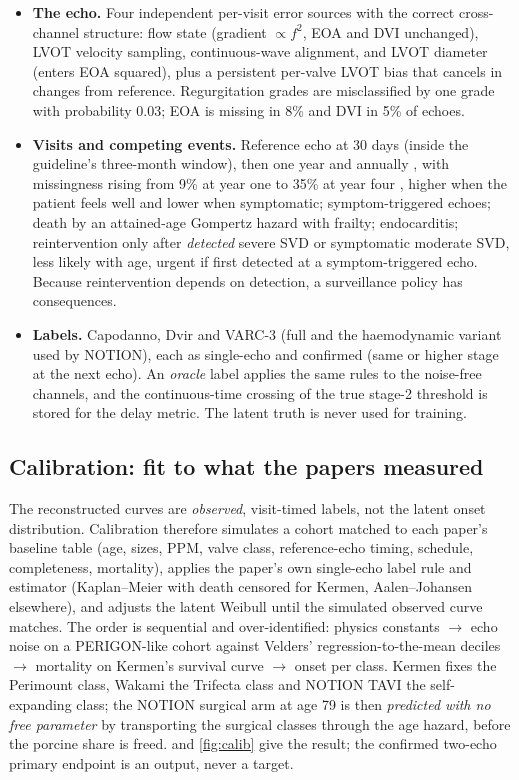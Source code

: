 \documentclass[11pt,a4paper]{article}
\begin{document}
\begin{itemize}
\item \textbf{The echo.} Four independent per-visit error sources with the correct cross-channel structure: flow state (gradient $\propto f^2$, EOA and DVI unchanged), LVOT velocity sampling, continuous-wave alignment, and LVOT diameter (enters EOA squared), plus a persistent per-valve LVOT bias that cancels in changes from reference. Regurgitation grades are misclassified by one grade with probability 0.03; EOA is missing in 8\% and DVI in 5\% of echoes.
\item \textbf{Visits and competing events.} Reference echo at 30 days (inside the guideline's three-month window), then one year and annually \cite{praz2025}, with missingness rising from 9\% at year one to 35\% at year four \cite{velders2024}, higher when the patient feels well and lower when symptomatic; symptom-triggered echoes; death by an attained-age Gompertz hazard with frailty; endocarditis; reintervention only after \emph{detected} severe SVD or symptomatic moderate SVD, less likely with age, urgent if first detected at a symptom-triggered echo. Because reintervention depends on detection, a surveillance policy has consequences.
\item \textbf{Labels.} Capodanno, Dvir and VARC-3 (full and the haemodynamic variant used by NOTION), each as single-echo and confirmed (same or higher stage at the next echo). An \emph{oracle} label applies the same rules to the noise-free channels, and the continuous-time crossing of the true stage-2 threshold is stored for the delay metric. The latent truth is never used for training.
\end{itemize}

\subsection{Calibration: fit to what the papers measured}
The reconstructed curves are \emph{observed}, visit-timed labels, not the latent onset distribution. Calibration therefore simulates a cohort matched to each paper's baseline table (age, sizes, PPM, valve class, reference-echo timing, schedule, completeness, mortality), applies the paper's own single-echo label rule and estimator (Kaplan--Meier with death censored for Kermen, Aalen--Johansen elsewhere), and adjusts the latent Weibull until the simulated observed curve matches. The order is sequential and over-identified: physics constants $\to$ echo noise on a PERIGON-like cohort against Velders' regression-to-the-mean deciles \cite{velders2024} $\to$ mortality on Kermen's survival curve $\to$ onset per class. Kermen fixes the Perimount class, Wakami the Trifecta class and NOTION TAVI the self-expanding class; the NOTION surgical arm at age 79 is then \emph{predicted with no free parameter} by transporting the surgical classes through the age hazard, before the porcine share is freed.  and \cref{fig:calib} give the result; the confirmed two-echo primary endpoint is an output, never a target.
\end{document}
